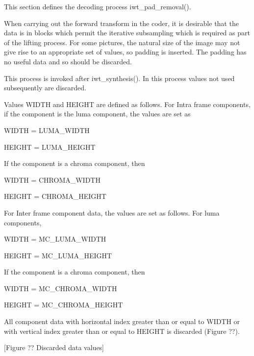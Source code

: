 This section defines the decoding process iwt\_pad\_removal().

When carrying out the forward transform in the coder, it is desirable
that the data is in blocks which permit the iterative subsampling which
is required as part of the lifting process. For some pictures, the
natural size of the image may not give rise to an appropriate set of
values, so padding is inserted. The padding has no useful data and so
should be discarded.

This process is invoked after iwt\_synthesis(). In this process values
not used subsequently are discarded.

Values WIDTH and HEIGHT are defined as follows. For Intra frame
components, if the component is the luma component, the values are set
as

WIDTH = LUMA\_WIDTH

HEIGHT = LUMA\_HEIGHT

If the component is a chroma component, then

WIDTH = CHROMA\_WIDTH

HEIGHT = CHROMA\_HEIGHT

For Inter frame component data, the values are set as follows. For luma
components,

WIDTH = MC\_LUMA\_WIDTH

HEIGHT = MC\_LUMA\_HEIGHT

If the component is a chroma component, then

WIDTH = MC\_CHROMA\_WIDTH

HEIGHT = MC\_CHROMA\_HEIGHT

All component data with horizontal index greater than or equal to WIDTH
or with vertical index greater than or equal to HEIGHT is discarded
(Figure ??).

[Figure ?? Discarded data values]

